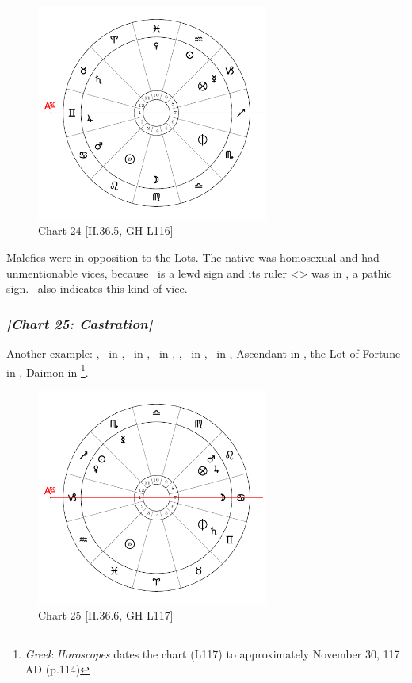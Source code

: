 \clearpage
\begin{figure}
\centering
\vspace{-30pt}
\includegraphics[width=0.68\textwidth]{charts/2_36_5}
\caption{Chart 24 [II.36.5, GH L116]}
\label{fig:chart24}
\end{figure}

\noindent Malefics were in opposition to the Lots. The native was homosexual and had unmentionable vices, because \Capricorn\, is a lewd sign and its ruler <\Saturn> was in \Taurus, a pathic sign. \Scorpio\, also indicates this kind of vice.

\newpage
\subsubsection{\textit{[Chart 25: Castration]}}
Another example: \Sun, \Venus\, in \Sagittarius, \Moon\, in \Cancer, \Saturn\, in \Gemini, \Jupiter, \Mars\, in \Leo, \Mercury\, in \Scorpio, Ascendant in \Capricorn, the Lot of Fortune in \Leo, Daimon in \Gemini
\footnote{\textit{Greek Horoscopes} dates the chart (L117) to approximately November 30, 117 AD (p.114)}. 

\clearpage
\begin{figure}
\centering
\vspace{-20pt}
\includegraphics[width=0.68\textwidth]{charts/2_36_6}
\caption{Chart 25 [II.36.6, GH L117]}
\label{fig:chart25}
\end{figure}

